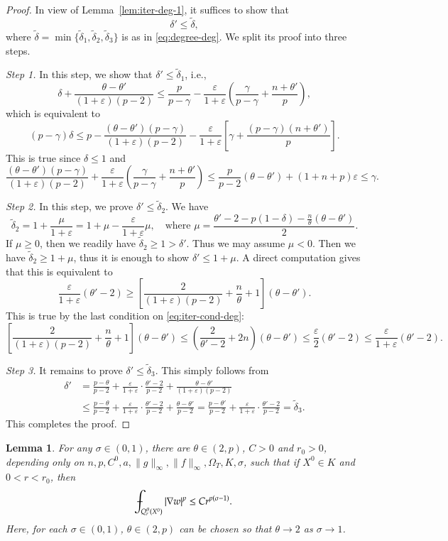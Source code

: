 \documentclass[11pt,oneside,english]{amsart}
\newcommand{\e}{\varepsilon}
\newcommand{\de}{\delta}
\newcommand{\D}{\nabla}
\numberwithin{equation}{section}
\def\Xint#1{\mathchoice
  {\XXint\displaystyle\textstyle{#1}}%
  {\XXint\textstyle\scriptstyle{#1}}%
  {\XXint\scriptstyle\scriptscriptstyle{#1}}%
  {\XXint\scriptscriptstyle\scriptscriptstyle{#1}}%
  \!\int}
\def\XXint#1#2#3{{\setbox0=\hbox{$#1{#2#3}{\int}$}
    \vcenter{\hbox{$#2#3$}}\kern-.5\wd0}}
\def\dashint{\Xint-}
\theoremstyle{plain}
\newtheorem{lemma}{Lemma}
\numberwithin{equation}{section}
\begin{document}
\begin{proof}
In view of Lemma~\ref{lem:iter-deg-1}, it suffices to show that
$$
\de'\le \tilde\de,
$$
where $\tilde\de=\min\{\tilde\de_1,\tilde\de_2,\tilde\de_3\}$ is as in \eqref{eq:degree-deg}. We split its proof into three steps.

\medskip\noindent\emph{Step 1.} In this step, we show that $\de'\le \tilde\de_1$, i.e.,
$$
\de+\frac{\theta-\theta'}{(1+\e)(p-2)}\le\frac{p}{p-\gamma}-\frac{\e}{1+\e}\left(\frac{\gamma}{p-\gamma}+\frac{n+\theta'}p\right),
$$
which is equivalent to
$$
(p-\gamma)\de\le p-\frac{(\theta-\theta')(p-\gamma)}{(1+\e)(p-2)}-\frac{\e}{1+\e}\left[\gamma+\frac{(p-\gamma)(n+\theta')}p \right].
$$
This is true since $\de\le1$ and
$$
\frac{(\theta-\theta')(p-\gamma)}{(1+\e)(p-2)}+\frac{\e}{1+\e}\left(\frac{\gamma}{p-\gamma}+\frac{n+\theta'}p\right)\le \frac{p}{p-2}(\theta-\theta')+(1+n+p)\e\le\gamma.
$$


\medskip\noindent\emph{Step 2.} In this step, we prove $\de'\le\tilde\de_2$.  We have  
$$
\tilde\de_2=1+\frac{\mu}{1+\e}=1+\mu-\frac{\e}{1+\e}\mu,\quad\text{where }\mu=\frac{\theta'-2-p(1-\de)-\frac{n}{\theta}(\theta-\theta') }2.
$$
If $\mu\ge0$, then we readily have $\tilde\de_2\ge1>\de'$. Thus we may assume $\mu<0$. Then we have $\tilde\de_2\ge 1+\mu$, thus it is enough to show $\de'\le 1+\mu$. A direct computation gives that this is equivalent to
$$
\frac{\e}{1+\e}(\theta'-2)\ge\left[\frac2{(1+\e)(p-2)}+\frac{n}\theta+1 \right](\theta-\theta').
$$
This is true by the last condition on \eqref{eq:iter-cond-deg}:
$$
\left[\frac2{(1+\e)(p-2)}+\frac{n}\theta+1 \right](\theta-\theta')\le\left(\frac{2}{\theta'-2}+2n\right)(\theta-\theta')\le\frac{\e}2(\theta'-2)\le\frac{\e}{1+\e}(\theta'-2).
$$

\medskip\noindent\emph{Step 3.} It remains to prove $\de'\le \tilde\de_3$. This simply follows from
\begin{align*}
\de'&=\frac{p-\theta}{p-2}+\frac{\e}{1+\e}\cdot\frac{\theta'-2}{p-2}+\frac{\theta-\theta'}{(1+\e)(p-2)}\\&\le\frac{p-\theta}{p-2}+\frac{\e}{1+\e}\cdot\frac{\theta'-2}{p-2}+\frac{\theta-\theta'}{p-2}=\frac{p-\theta'}{p-2}+\frac{\e}{1+\e}\cdot\frac{\theta'-2}{p-2}=\tilde\de_3.
\end{align*}
This completes the proof.    
\end{proof}



\begin{lemma}
    \label{lem:par-u-v-est-deg}
    For any $\sigma\in(0,1)$, there are $\theta\in(2,p)$, $C>0$ and $r_0>0$, depending only on $n,p,C^0,a,\|g\|_\infty,\|f\|_\infty,\Omega_T,K,\sigma$, such that if $X^0\in K$ and $0<r<r_0$, then
    $$
    \dashint_{Q_r^\theta(X^0)}|\D w|^p\le Cr^{p(\sigma-1)}.
    $$
    Here, for each $\sigma\in(0,1)$, $\theta\in(2,p)$ can be chosen so that $\theta\to2$ as $\sigma\to1$.
\end{lemma}
\end{document}

